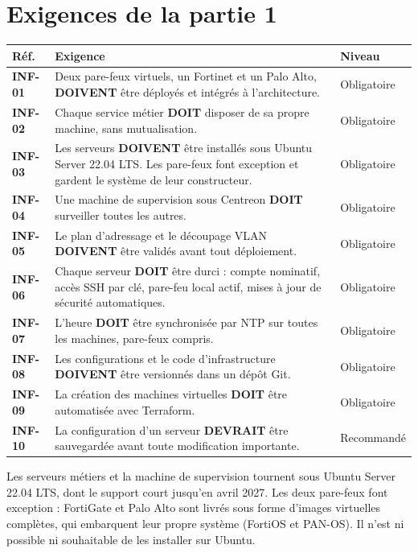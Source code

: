 \documentclass[11pt,a4paper]{article}
\newcommand{\rid}[1]{\textcolor{primary}{\textbf{\small #1}}}
\begin{document}
\section{Exigences de la partie 1}
\begin{table}[H]
\centering
\begin{tabularx}{\textwidth}{L{1.4cm} Y C{2.3cm}}
\toprule
{}\textbf{Réf.} & \textbf{Exigence} & \textbf{Niveau} \\
\midrule
\rid{INF-01} & Deux pare-feux virtuels, un Fortinet et un Palo Alto, \textbf{DOIVENT} être déployés et intégrés à l'architecture. & Obligatoire \\
\rid{INF-02} & Chaque service métier \textbf{DOIT} disposer de sa propre machine, sans mutualisation. & Obligatoire \\
\rid{INF-03} & Les serveurs \textbf{DOIVENT} être installés sous Ubuntu Server 22.04 LTS. Les pare-feux font exception et gardent le système de leur constructeur. & Obligatoire \\
\rid{INF-04} & Une machine de supervision sous Centreon \textbf{DOIT} surveiller toutes les autres. & Obligatoire \\
\rid{INF-05} & Le plan d'adressage et le découpage VLAN \textbf{DOIVENT} être validés avant tout déploiement. & Obligatoire \\
\rid{INF-06} & Chaque serveur \textbf{DOIT} être durci : compte nominatif, accès SSH par clé, pare-feu local actif, mises à jour de sécurité automatiques. & Obligatoire \\
\rid{INF-07} & L'heure \textbf{DOIT} être synchronisée par NTP sur toutes les machines, pare-feux compris. & Obligatoire \\
\rid{INF-08} & Les configurations et le code d'infrastructure \textbf{DOIVENT} être versionnés dans un dépôt Git. & Obligatoire \\
\rid{INF-09} & La création des machines virtuelles \textbf{DOIT} être automatisée avec Terraform. & Obligatoire \\
\rid{INF-10} & La configuration d'un serveur \textbf{DEVRAIT} être sauvegardée avant toute modification importante. & Recommandé \\
\bottomrule
\end{tabularx}
\end{table}

\begin{notebox}
Les serveurs métiers et la machine de supervision tournent sous Ubuntu Server 22.04 LTS, dont le support court jusqu'en avril 2027. Les deux pare-feux font exception : FortiGate et Palo Alto sont livrés sous forme d'images virtuelles complètes, qui embarquent leur propre système (FortiOS et PAN-OS). Il n'est ni possible ni souhaitable de les installer sur Ubuntu.
\end{notebox}
\end{document}

